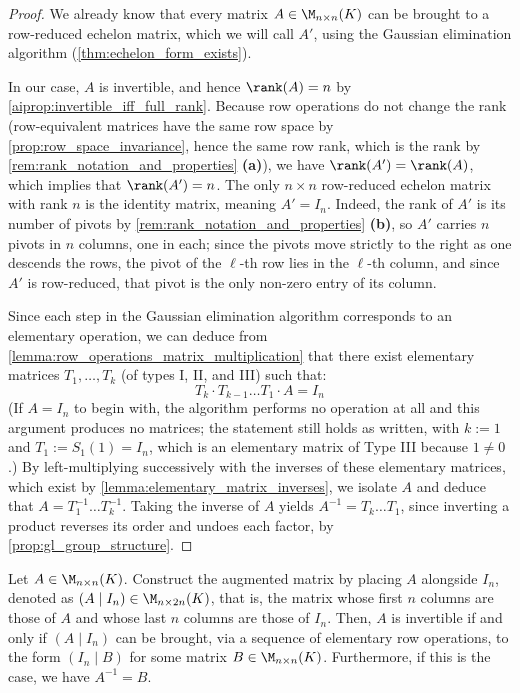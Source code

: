 \begin{proof}
We already know that every matrix $A \in \M_{n \times n}(K)$ can be brought to a row-reduced echelon matrix, which we will call $A'$, using the Gaussian elimination algorithm (\cref{thm:echelon_form_exists}).

In our case, $A$ is invertible, and hence $\rank(A) = n$ by \cref{aiprop:invertible_iff_full_rank}. Because row operations do not change the rank (row-equivalent matrices have the same row space by \cref{prop:row_space_invariance}, hence the same row rank, which is the rank by \cref{rem:rank_notation_and_properties} \textbf{(a)}), we have $\rank(A') = \rank(A)$, which implies that $\rank(A') = n$. The only $n \times n$ row-reduced echelon matrix with rank $n$ is the identity matrix, meaning $A' = I_n$. Indeed, the rank of $A'$ is its number of pivots by \cref{rem:rank_notation_and_properties} \textbf{(b)}, so $A'$ carries $n$ pivots in $n$ columns, one in each; since the pivots move strictly to the right as one descends the rows, the pivot of the $\ell$-th row lies in the $\ell$-th column, and since $A'$ is row-reduced, that pivot is the only non-zero entry of its column.

Since each step in the Gaussian elimination algorithm corresponds to an elementary operation, we can deduce from \cref{lemma:row_operations_matrix_multiplication} that there exist elementary matrices $T_1, \dots, T_k$ (of types I, II, and III) such that:
\begin{equation*}
    T_k \cdot T_{k-1} \dots T_1 \cdot A = I_n
\end{equation*}
(If $A = I_n$ to begin with, the algorithm performs no operation at all and this argument produces no matrices; the statement still holds as written, with $k := 1$ and $T_1 := S_1(1) = I_n$, which is an elementary matrix of Type III because $1 \neq 0$.)
By left-multiplying successively with the inverses of these elementary matrices, which exist by \cref{lemma:elementary_matrix_inverses}, we isolate $A$ and deduce that $A = T_1^{-1} \dots T_k^{-1}$. Taking the inverse of $A$ yields $A^{-1} = T_k \dots T_1$, since inverting a product reverses its order and undoes each factor, by \cref{prop:gl_group_structure}.
\end{proof}

\begin{theorem}
\label{thm:matrix_inversion_algorithm}
Let $A \in \M_{n \times n}(K)$. Construct the augmented matrix by placing $A$ alongside $I_n$, denoted as $(A \mid I_n) \in \M_{n \times 2n}(K)$, that is, the matrix whose first $n$ columns are those of $A$ and whose last $n$ columns are those of $I_n$. Then, $A$ is invertible if and only if $(A \mid I_n)$ can be brought, via a sequence of elementary row operations, to the form $(I_n \mid B)$ for some matrix $B \in \M_{n \times n}(K)$. Furthermore, if this is the case, we have $A^{-1} = B$.
\end{theorem}

